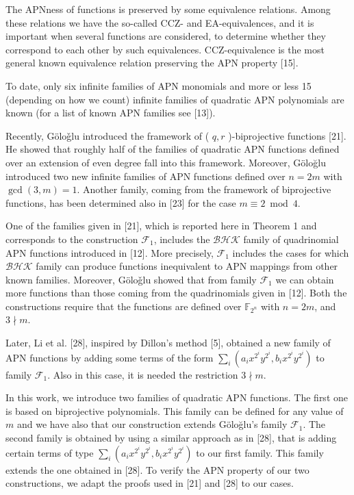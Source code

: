\documentclass[10pt]{article}
\begin{document}
The APNness of functions is preserved by some equivalence relations. Among these relations we have the so-called CCZ- and EA-equivalences, and it is important when several functions are considered, to determine whether they correspond to each other by such equivalences. CCZ-equivalence is the most general known equivalence relation preserving the APN property [15].

To date, only six infinite families of APN monomials and more or less 15 (depending on how we count) infinite families of quadratic APN polynomials are known (for a list of known APN families see [13]).

Recently, Göloǧlu introduced the framework of ( $q, r$ )-biprojective functions [21]. He showed that roughly half of the families of quadratic APN functions defined over an extension of even degree fall into this framework. Moreover, Göloğlu introduced two new infinite families of APN functions defined over $n=2 m$ with $\operatorname{gcd}(3, m)=1$. Another family, coming from the framework of biprojective functions, has been determined also in [23] for the case $m \equiv 2 \bmod 4$.

One of the families given in [21], which is reported here in Theorem 1 and corresponds to the construction $\mathcal{F}_{1}$, includes the $\mathcal{B} \mathcal{H} \mathcal{K}$ family of quadrinomial APN functions introduced in [12]. More precisely, $\mathcal{F}_{1}$ includes the cases for which $\mathcal{B} \mathcal{H} \mathcal{K}$ family can produce functions inequivalent to APN mappings from other known families. Moreover, Göloǧlu showed that from family $\mathcal{F}_{1}$ we can obtain more functions than those coming from the quadrinomials given in [12]. Both the constructions require that the functions are defined over $\mathbb{F}_{2^{n}}$ with $n=2 m$, and $3 \nmid m$.

Later, Li et al. [28], inspired by Dillon's method [5], obtained a new family of APN functions by adding some terms of the form $\sum_{i}\left(a_{i} x^{2^{i}} y^{2^{i}}, b_{i} x^{2^{i}} y^{2^{i}}\right)$ to family $\mathcal{F}_{1}$. Also in this case, it is needed the restriction $3 \nmid m$.

In this work, we introduce two families of quadratic APN functions. The first one is based on biprojective polynomials. This family can be defined for any value of $m$ and we have also that our construction extends Göloğlu's family $\mathcal{F}_{1}$. The second family is obtained by using a similar approach as in [28], that is adding certain terms of type $\sum_{i}\left(a_{i} x^{2^{i}} y^{2^{i}}, b_{i} x^{2^{i}} y^{2^{i}}\right)$ to our first family. This family extends the one obtained in [28]. To verify the APN property of our two constructions, we adapt the proofs used in [21] and [28] to our cases.
\end{document}
